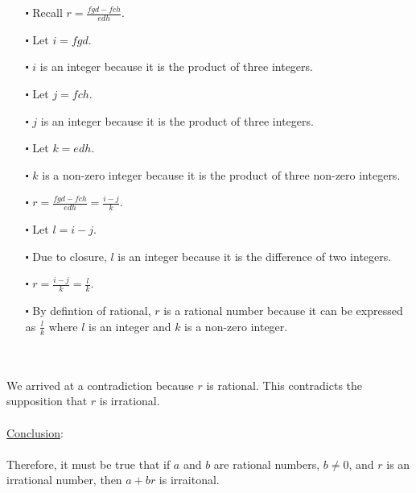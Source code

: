 \documentclass[12pt]{article}
\begin{document}
\begin{itemize}
  \item [$\centerdot$] Recall $r = \frac{fgd - fch}{edh}$.
  \item [$\centerdot$] Let $i = fgd$.
  \item [$\centerdot$] $i$ is an integer because it is the product of three integers.
  \item [$\centerdot$] Let $j = fch$.
  \item [$\centerdot$] $j$ is an integer because it is the product of three integers.
  \item [$\centerdot$] Let $k = edh$.
  \item [$\centerdot$] $k$ is a non-zero integer because it is the product of three non-zero integers.
  \item [$\centerdot$] $r = \frac{fgd - fch}{edh} = \frac{i - j}{k}$.
  \item [$\centerdot$] Let $l = i - j$. 
  \item [$\centerdot$] Due to closure, $l$ is an integer because it is the difference of two integers.
  \item [$\centerdot$] $r = \frac{i - j}{k} = \frac{l}{k}$.
  \item [$\centerdot$] By defintion of rational, $r$ is a rational number 
  because it can be expressed as $\frac{l}{k}$ where $l$ is an integer and $k$ is a non-zero integer.
\end{itemize}
\newblock
\\ \\
We arrived at a contradiction because $r$ is rational. This contradicts the supposition that $r$ is irrational.
\\ \\
\underline{Conclusion}:
\\ \\
Therefore, it must be true that if $a$ and $b$ are rational numbers, $b\neq0$, and $r$ is an irrational number, then $a+br$ is irraitonal.
\end{document}
